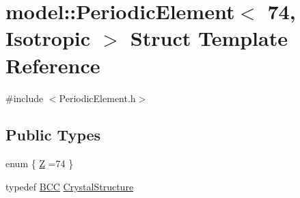 \hypertarget{structmodel_1_1_periodic_element_3_0174_00_01_isotropic_01_4}{}\section{model\+:\+:Periodic\+Element$<$ 74, Isotropic $>$ Struct Template Reference}
\label{structmodel_1_1_periodic_element_3_0174_00_01_isotropic_01_4}


{\ttfamily \#include $<$Periodic\+Element.\+h$>$}

\subsection*{Public Types}
\begin{DoxyCompactItemize}
\item 
enum \{ \hyperlink{structmodel_1_1_periodic_element_3_0174_00_01_isotropic_01_4_ad1732a5fe112afbead81617548f86084a78e486156dc79805b207f4a846c0bc0e}{Z} =74
 \}
\item 
typedef \hyperlink{structmodel_1_1_b_c_c}{B\+C\+C} \hyperlink{structmodel_1_1_periodic_element_3_0174_00_01_isotropic_01_4_a3310fc11dcea8779fb20b276a0c1fb5a}{Crystal\+Structure}
\end{DoxyCompactItemize}

